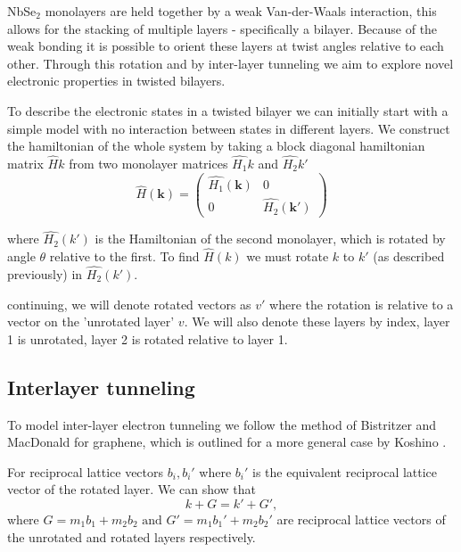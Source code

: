 \documentclass[12pt]{report} %
\begin{document}
  NbSe$_2$ monolayers are held together by a weak Van-der-Waals interaction, this allows for the stacking of multiple layers - specifically a bilayer. Because of the weak bonding it is possible to orient these layers at twist angles relative to each other. Through this rotation and by inter-layer tunneling we aim to explore novel electronic properties in twisted bilayers.

  To describe the electronic states in a twisted bilayer we can initially start with a simple model with no interaction between states in different layers. We construct the hamiltonian of the whole system by taking a block diagonal hamiltonian matrix $\hat{H}{k}$ from two monolayer matrices $\hat{H_1}{k}$ and $\hat{H_2}{k'}$
%
      \begin{equation}
        \hat{H}(\boldsymbol{k})=\left(\begin{array}{cc}
          \hat{H_1}(\boldsymbol{k}) & 0\\
          0 & \hat{H_2}(\boldsymbol{k'})
        \end{array}\right)
        \label{simple_bilayer_hamiltonian}
      \end{equation}
      
  where $\hat{H_2}(k')$ is the Hamiltonian of the second monolayer, which is rotated by angle $\theta$ relative to the first. To find $\hat{H}(k)$ we must rotate $k$ to $k'$ (as described previously) in $\hat{H_2}(k')$.

  continuing, we will denote rotated vectors as $v'$ where the rotation is relative to a vector on the 'unrotated layer' $v$. We will also denote these layers by index, layer 1 is unrotated, layer 2 is rotated relative to layer 1.

\subsection*{Interlayer tunneling}
  To model inter-layer electron tunneling we follow the method of Bistritzer and MacDonald \cite{Bistritzer2011} for graphene, which is outlined for a more general case by Koshino \cite{Koshino2015}.

  For reciprocal lattice vectors $b_i, b_i'$ where $b_i'$ is the equivalent reciprocal lattice vector of the rotated layer. We can show that
  \begin{equation}
    k + G = k' + G',
    \label{inter-layer_k_plus_G}
  \end{equation}
  where $G = m_1 b_1 + m_2 b_2 \text{ and } G' = m_1 b_1' + m_2 b_2'$ are reciprocal lattice vectors of the unrotated and rotated layers respectively.
\end{document}
